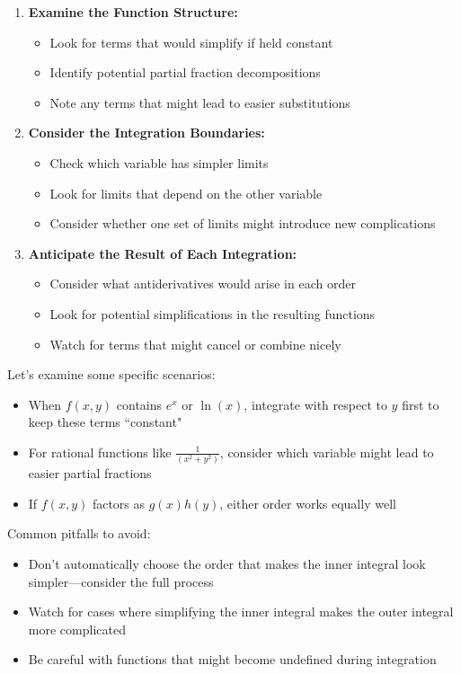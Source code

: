 \begin{enumerate}
   \item \textbf{Examine the Function Structure:}
       \begin{itemize}
           \item Look for terms that would simplify if held constant
           \item Identify potential partial fraction decompositions
           \item Note any terms that might lead to easier substitutions
       \end{itemize}
   
   \item \textbf{Consider the Integration Boundaries:}
       \begin{itemize}
           \item Check which variable has simpler limits
           \item Look for limits that depend on the other variable
           \item Consider whether one set of limits might introduce new complications
       \end{itemize}
   
   \item \textbf{Anticipate the Result of Each Integration:}
       \begin{itemize}
           \item Consider what antiderivatives would arise in each order
           \item Look for potential simplifications in the resulting functions
           \item Watch for terms that might cancel or combine nicely
       \end{itemize}
\end{enumerate}

\noindent Let's examine some specific scenarios:

\begin{itemize}
   \item When $f(x,y)$ contains $e^x$ or $\ln(x)$, integrate with respect to $y$ first to keep these terms ``constant"
   \item For rational functions like $\frac{1}{(x^2+y^2)}$, consider which variable might lead to easier partial fractions
   \item If $f(x,y)$ factors as $g(x)h(y)$, either order works equally well
\end{itemize}

\noindent Common pitfalls to avoid:
\begin{itemize}
   \item Don't automatically choose the order that makes the inner integral look simpler—consider the full process
   \item Watch for cases where simplifying the inner integral makes the outer integral more complicated
   \item Be careful with functions that might become undefined during integration
\end{itemize}

